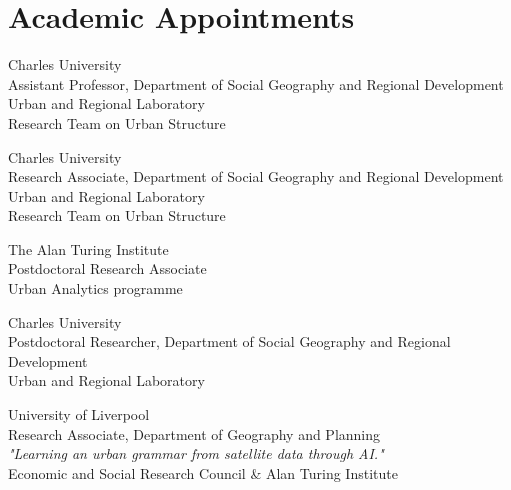 \documentclass[12pt,a4paper]{report}
\begin{document}
    \section*{Academic Appointments}

    \begin{tablist}

        \item[2026--] \tab{}Charles University \\
                            Assistant Professor, Department of Social Geography and Regional Development \\
                            Urban and Regional Laboratory \\
                            Research Team on Urban Structure

        \item[2024--26] \tab{}Charles University \\
                            Research Associate, Department of Social Geography and Regional Development \\
                            Urban and Regional Laboratory \\
                            Research Team on Urban Structure

        \item[2023--24] \tab{}The Alan Turing Institute \\
                            Postdoctoral Research Associate \\
                            Urban Analytics programme

        \item[2022--23] \tab{}Charles University \\
                            Postdoctoral Researcher, Department of Social Geography and Regional Development \\
                            Urban and Regional Laboratory

        \item[2020--22] \tab{}University of Liverpool \\
                            Research Associate, Department of Geography and Planning \\
                            \textit{"Learning an urban grammar from satellite data through AI."} \\
                            Economic and Social Research Council \& Alan Turing Institute

    \end{tablist}
\end{document}
